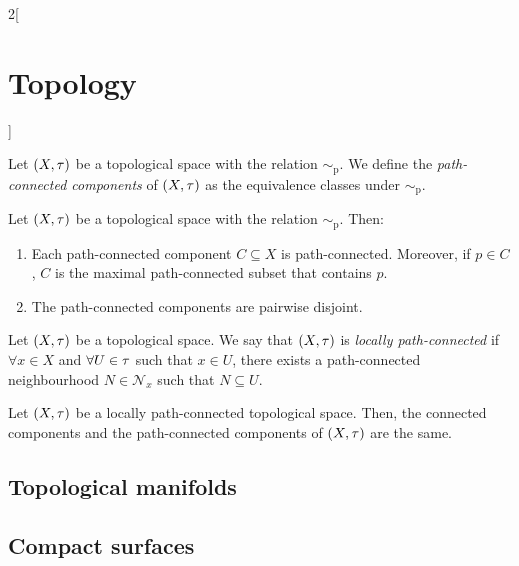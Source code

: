 \documentclass[../../../main.tex]{subfiles}
\begin{document}
\begin{multicols}{2}[\section{Topology}]
\begin{prop}
    \end{prop}
    \begin{definition}
        Let $(X,\tau)$ be a topological space with the relation $\sim_\text{p}$. We define the \emph{path-connected components} of $(X,\tau)$ as the equivalence classes under $\sim_\text{p}$.
    \end{definition}
    \begin{prop}
        Let $(X,\tau)$ be a topological space with the relation $\sim_\text{p}$. Then:
        \begin{enumerate}
            \item Each path-connected component $C\subseteq X$ is path-connected. Moreover, if $p\in C$, $C$ is the maximal path-connected subset that contains $p$.
            \item The path-connected components are pairwise disjoint.
        \end{enumerate}
    \end{prop}
    \begin{definition}
        Let $(X,\tau)$ be a topological space. We say that $(X,\tau)$ is \emph{locally path-connected} if $\forall x\in X$ and $\forall U\in\tau$ such that $x\in U$, there exists a path-connected neighbourhood $N\in\mathcal{N}_x$ such that $N\subseteq U$.
    \end{definition}
    \begin{theorem}
        Let $(X,\tau)$ be a locally path-connected topological space. Then, the connected components and the path-connected components of $(X,\tau)$ are the same.
    \end{theorem}
    \subsection{Topological manifolds}
    \subsection{Compact surfaces}
\end{multicols}
\end{document}
